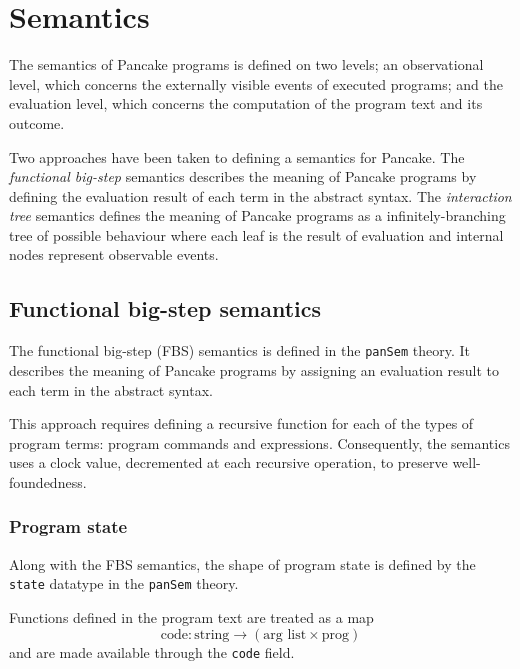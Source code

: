 \documentclass[12pt,a4paper]{report}
\begin{document}
\chapter{Semantics}
\label{cha:semantics}

The semantics of Pancake programs is defined on two levels; an observational level, which concerns the externally visible events of executed programs; and the evaluation level, which concerns the computation of the program text and its outcome.

Two approaches have been taken to defining a semantics for Pancake. The \emph{functional big-step} semantics \cite{owens_functional_2016} describes the meaning of Pancake programs by defining the evaluation result of each term in the abstract syntax. The \emph{interaction tree} semantics defines the meaning of Pancake programs as a infinitely-branching tree of possible behaviour where each leaf is the result of evaluation and internal nodes represent observable events.

\section{Functional big-step semantics}
\label{sec:functional-big-step}

The functional big-step (FBS) semantics is defined in the \texttt{panSem} theory. It describes the meaning of Pancake programs by assigning an evaluation result to each term in the abstract syntax.

This approach requires defining a recursive function for each of the types of program terms: program commands and expressions. Consequently, the semantics uses a clock value, decremented at each recursive operation, to preserve well-foundedness.

\subsection{Program state}
\label{sec:program-state}

Along with the FBS semantics, the shape of program state is defined by the \texttt{state} datatype in the \texttt{panSem} theory.

Functions defined in the program text are treated as a map
\begin{equation*}
  \text{code} : \text{string} \to (\text{arg list} \times \text{prog})
\end{equation*}
and are made available through the \texttt{code} field.
\end{document}
